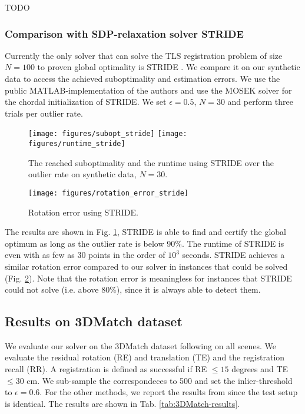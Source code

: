 TODO 

\subsubsection{Comparison with SDP-relaxation solver STRIDE} Currently the only solver that can solve the TLS registration problem of size $N=100$ to proven global optimality is STRIDE \cite{9785843}. We compare it on our synthetic data to access the achieved suboptimality and estimation errors. We use the public MATLAB-implementation of the authors and use the MOSEK solver for the chordal initialization of STRIDE.
We set $\epsilon = 0.5$, $N=30$ and perform three trials per outlier rate.

\begin{figure}[!ht]
	\centering
	\texttt{[image: figures/subopt\_stride]}
	\texttt{[image: figures/runtime\_stride]}
	\caption{The reached suboptimality and the runtime using STRIDE over the outlier rate on synthetic data, $N=30$.}
	\label{fig:stride-subopt-eval}
\end{figure}
\begin{figure}[!ht]
	\centering
	\texttt{[image: figures/rotation\_error\_stride]}
	\caption{Rotation error using STRIDE.}
	\label{fig:stride-rot-err}
\end{figure}

The results are shown in Fig. \ref{fig:stride-subopt-eval}, STRIDE is able to find and certify the global optimum as long as the outlier rate is below 90\%. The runtime of STRIDE is even with as few as 30 points in the order of $10^3$ seconds. STRIDE achieves a similar rotation error compared to our solver in instances that could be solved (Fig. \ref{fig:stride-rot-err}). Note that the rotation error is meaningless for instances that STRIDE could not solve (i.e. above 80\%), since it is always able to detect them.

\subsection{Results on 3DMatch dataset}

We evaluate our solver on the 3DMatch dataset \cite{zeng20163dmatch} 
following \cite{SC2-PCR-Chen-2022-CVPR, zhang20233d} on all scenes. We evaluate the residual rotation (RE) and translation (TE) and the registration recall (RR). A registration is defined as successful if RE $\leq 15$ degrees and TE $\leq 30$ cm. We sub-sample the correspondeces to 500 and set the inlier-threshold to $\epsilon = 0.6$. For the other methods, we report the results from \cite{zhang20233d} since the test setup is identical. The results are shown in Tab. \ref{tab:3DMatch-results}.

